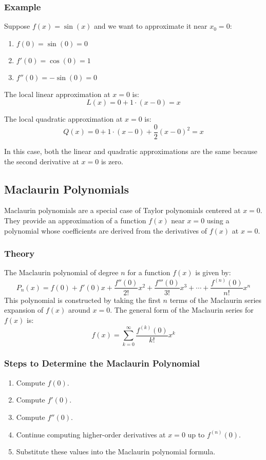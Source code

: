 \documentclass{article}
\begin{document}
\subsubsection*{Example}
Suppose \( f(x) = \sin(x) \) and we want to approximate it near \( x_0 = 0 \):
\begin{enumerate}
\item \( f(0) = \sin(0) = 0 \)
\item \( f'(0) = \cos(0) = 1 \)
\item \( f''(0) = -\sin(0) = 0 \)
\end{enumerate}

The local linear approximation at \( x = 0 \) is:
\[ L(x) = 0 + 1 \cdot (x - 0) = x \]

The local quadratic approximation at \( x = 0 \) is:
\[ Q(x) = 0 + 1 \cdot (x - 0) + \frac{0}{2}(x - 0)^2 = x \]

In this case, both the linear and quadratic approximations are the same because the second derivative at \( x = 0 \) is zero.

\subsection*{Maclaurin Polynomials}
Maclaurin polynomials are a special case of Taylor polynomials centered at \( x = 0 \). They provide an approximation of a function \( f(x) \) near \( x = 0 \) using a polynomial whose coefficients are derived from the derivatives of \( f(x) \) at \( x = 0 \).

\subsubsection*{Theory}
The Maclaurin polynomial of degree \( n \) for a function \( f(x) \) is given by:
\[ P_n(x) = f(0) + f'(0)x + \frac{f''(0)}{2!}x^2 + \frac{f'''(0)}{3!}x^3 + \cdots + \frac{f^{(n)}(0)}{n!}x^n \]
This polynomial is constructed by taking the first \( n \) terms of the Maclaurin series expansion of \( f(x) \) around \( x = 0 \). The general form of the Maclaurin series for \( f(x) \) is:
\[ f(x) = \sum_{k=0}^{\infty} \frac{f^{(k)}(0)}{k!} x^k \]

\subsubsection*{Steps to Determine the Maclaurin Polynomial}
\begin{enumerate}
\item Compute \( f(0) \).
\item Compute \( f'(0) \).
\item Compute \( f''(0) \).
\item Continue computing higher-order derivatives at \( x = 0 \) up to \( f^{(n)}(0) \).
\item Substitute these values into the Maclaurin polynomial formula.
\end{enumerate}
\end{document}
